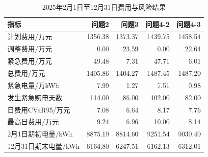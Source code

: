 \begin{table}[htbp]\centering\small\caption{2025年2月1日至12月31日费用与风险结果}\label{tab:annual}
\begin{tabularx}{\linewidth}{LRRRR}\toprule
指标 & 问题2 & 问题3 & 问题4-2 & 问题4-3\\\midrule
计划费用/万元 & 1356.38 & 1373.37 & 1439.75 & 1458.54\\
调整费用/万元 & 0.00 & 23.59 & 0.00 & 22.64\\
紧急费用/万元 & 49.48 & 7.31 & 47.71 & 6.01\\
总费用/万元 & 1405.86 & 1404.27 & 1487.45 & 1487.20\\
紧急电量/万kWh & 7.99 & 1.27 & 7.51 & 0.98\\
发生紧急购电天数 & 114.00 & 86.00 & 102.00 & 82.00\\
日费用CVaR95/万元 & 7.08 & 6.64 & 8.17 & 7.76\\
最高日费用/万元 & 9.24 & 6.96 & 10.00 & 8.14\\
2月1日期初电量/kWh & 8875.19 & 8814.60 & 9251.54 & 9030.40\\
12月31日期末电量/kWh & 6164.80 & 6247.51 & 6162.13 & 6312.01\\
\bottomrule\end{tabularx}\end{table}